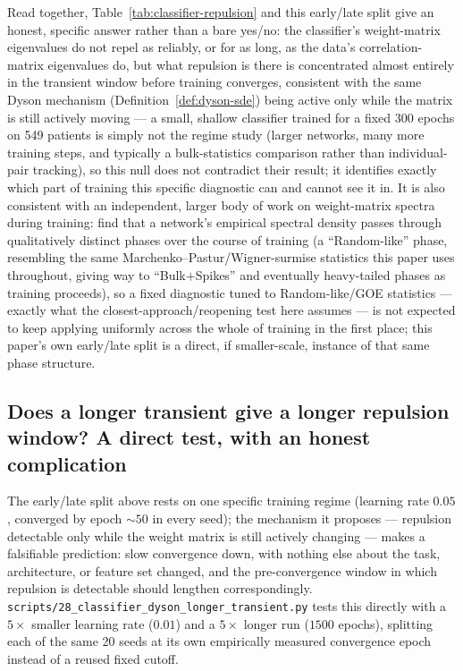 \documentclass[11pt]{article}
\begin{document}
Read together, Table~\ref{tab:classifier-repulsion} and this
early/late split give an honest, specific answer rather than a bare
yes/no: the classifier's weight-matrix eigenvalues do not repel as
reliably, or for as long, as the data's correlation-matrix eigenvalues
do, but what repulsion is there is concentrated almost entirely in the
transient window before training converges, consistent with the same
Dyson mechanism (Definition~\ref{def:dyson-sde}) being active only
while the matrix is still actively moving --- a small, shallow
classifier trained for a fixed 300 epochs on 549 patients is simply not
the regime \citet{aarts2024} study (larger networks, many more training
steps, and typically a bulk-statistics comparison rather than
individual-pair tracking), so this null does not contradict their
result; it identifies exactly which part of training this specific
diagnostic can and cannot see it in. It is also consistent with an
independent, larger body of work on weight-matrix spectra during
training: \citet{mahoneymartin2019} find that a network's empirical
spectral density passes through qualitatively distinct phases over the
course of training (a ``Random-like'' phase, resembling the same
Marchenko--Pastur/Wigner-surmise statistics this paper uses throughout,
giving way to ``Bulk$+$Spikes'' and eventually heavy-tailed phases as
training proceeds), so a fixed diagnostic tuned to Random-like/GOE
statistics --- exactly what the closest-approach/reopening test here
assumes --- is not expected to keep applying uniformly across the whole
of training in the first place; this paper's own early/late split is a
direct, if smaller-scale, instance of that same phase structure.

\subsection{Does a longer transient give a longer repulsion window? A direct test, with an honest complication}
\label{sec:results-dyson-classifier-longer}

The early/late split above rests on one specific training regime
(learning rate $0.05$, converged by epoch $\sim\!50$ in every seed);
the mechanism it proposes --- repulsion detectable only while the
weight matrix is still actively changing --- makes a falsifiable
prediction: slow convergence down, with nothing else about the task,
architecture, or feature set changed, and the pre-convergence window in
which repulsion is detectable should lengthen correspondingly.
\texttt{scripts/28\_classifier\_dyson\_longer\_transient.py} tests this
directly with a $5\times$ smaller learning rate ($0.01$) and a
$5\times$ longer run ($1500$ epochs), splitting each of the same 20
seeds at its own empirically measured convergence epoch instead of a
reused fixed cutoff.
\end{document}
